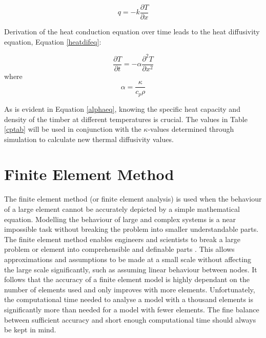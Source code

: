 	\begin{equation}
	\label{heat_eq}
		q = -k \frac{\partial{T}}{\partial{x}}
	\end{equation}

Derivation of the heat conduction equation over time leads to the heat diffusivity equation, Equation \ref{heatdifeq}:

\begin{equation}\label{heatdifeq}
\frac{\partial T}{\partial t} = -\alpha \frac{\partial^2 T}{\partial x^2}
\end{equation}
where 
\begin{equation}\label{alphaeq}
\alpha = \frac{\kappa}{c_p\rho}
\end{equation}

As is evident in Equation \ref{alphaeq}, knowing the specific heat capacity and density of the timber at different temperatures is crucial.
The values in Table \ref{cptab} will be used in conjunction with the $\kappa$-values determined through simulation to calculate new thermal diffusivity values.

\section{Finite Element Method}\label{femsec}
The finite element method  (or finite element analysis) is  used when the behaviour of a large element cannot be accurately depicted by a simple mathematical equation. 
Modelling the behaviour of large and complex systems is a near impossible task without breaking the problem into smaller understandable parts.
The finite element method enables engineers and scientists to break a large problem or element into comprehensible and definable parts \citep{Zienkiewicz:2000}. 
This allows approximations and assumptions to be made at a small scale without affecting the large scale significantly, such as assuming linear behaviour between nodes. 
It follows that the accuracy of a finite element model is highly dependant on the number of elements used and only improves with more elements.
Unfortunately, the computational time needed to analyse a model with a thousand elements is significantly more than needed for a model with fewer elements.
The fine balance between sufficient accuracy and short enough computational time should always be kept in mind.


